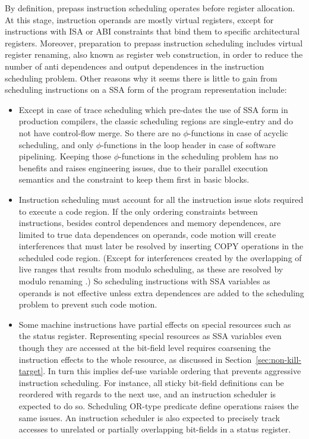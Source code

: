 By definition, prepass instruction scheduling operates before register
allocation. At this stage, instruction operands are mostly virtual registers,
except for instructions with ISA or ABI constraints that bind them to specific
architectural registers. Moreover, preparation to prepass instruction
scheduling includes virtual register renaming, also known as register web
construction, in order to reduce the number of anti dependences and output
dependences in the instruction scheduling problem. Other reasons why it seems
there is little to gain from scheduling instructions on a SSA form of the program
representation include: \begin{itemize}

\item Except in case of trace scheduling which pre-dates the use of SSA form in
production compilers, the classic scheduling regions are single-entry and do not
have control-flow merge. So there are no $\phi$-functions in case of acyclic
scheduling, and only $\phi$-functions in the loop header in case of software
pipelining. Keeping those $\phi$-functions in the scheduling problem has no
benefits and raises engineering issues, due to their parallel execution
semantics and the constraint to keep them first in basic blocks.

\item Instruction scheduling must account for all the instruction issue slots
required to execute a code region. If the only ordering constraints between
instructions, besides control dependences and memory dependences, are limited to
true data dependences on operands, code motion will create interferences that
must later be resolved by inserting COPY operations in the scheduled code
region. (Except for interferences created by the overlapping of live ranges
that results from modulo scheduling, as these are resolved by modulo renaming
\cite{Lam:1988:PLDI}.) So scheduling instructions with SSA variables as operands
is not effective unless extra dependences are added to the scheduling problem to
prevent such code motion. 

\item Some machine instructions have partial effects on special resources such
as the status register. Representing special resources as SSA variables even
though they are accessed at the bit-field level requires coarsening the
instruction effects to the whole resource, as discussed in
Section~\ref{sec:non-kill-target}. In turn this implies def-use variable
ordering that prevents aggressive instruction scheduling. For instance, all
{sticky} bit-field definitions can be reordered with regards to the next use,
and an instruction scheduler is expected to do so. Scheduling OR-type predicate
define operations \cite{Schlansker:1999:PLDI} raises the same issues.  An
instruction scheduler is also expected to precisely track accesses to unrelated
or partially overlapping bit-fields in a status register.


\end{itemize}
